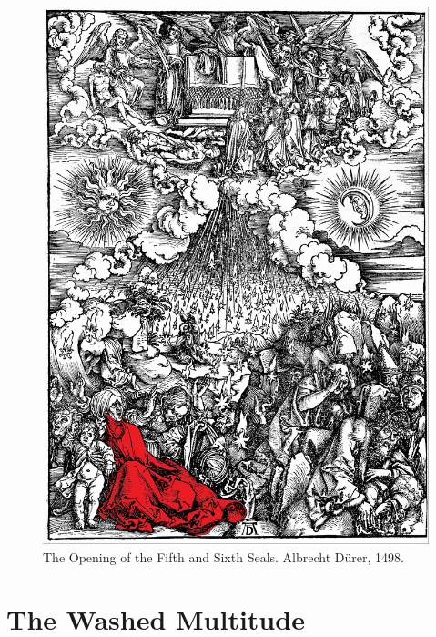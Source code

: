\documentclass[12pt,twoside]{memoir}
\begin{document}
  \begin{figure}[p]
  	\centering
  	\includegraphics[scale=0.3]{Durer/Durer_Sixth_Seal.jpg}
  	\caption{The Opening of the Fifth and Sixth Seals. Albrecht Dürer, 1498.}
  \end{figure}


\chapter{The Washed Multitude}
\end{document}

